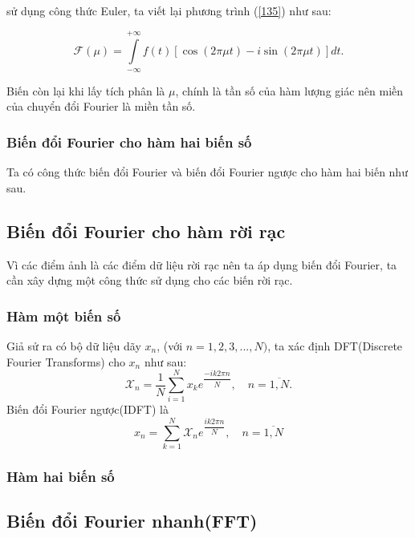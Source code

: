 \documentclass[12pt,a4paper]{report}
\numberwithin{equation}{section}
\theoremstyle{definition} %
\begin{document}
sử dụng công thức Euler, ta viết lại phương trình (\ref{135}) như sau:

\begin{equation}
	\label{137}
     \mathcal{F}(\mu)=\int\limits_{-\infty}^{+\infty}f(t)[\cos(2\pi\mu t)-i\sin(2\pi\mu t)]dt.
\end{equation}

Biến còn lại khi lấy tích phân là $\mu$, chính là tần số của hàm lượng giác nên miền của chuyển đổi Fourier là miền tần số.

\subsubsection{Biến đổi Fourier cho hàm hai biến số}

Ta có công thức biến đổi Fourier và biến đổi Fourier ngược cho hàm hai biến như sau.





\subsection{Biến đổi Fourier cho hàm rời rạc}

Vì các điểm ảnh là các điểm dữ liệu rời rạc nên ta áp dụng biến đổi Fourier, ta cần xây dựng một công thức sử dụng cho các biến rời rạc.

\subsubsection{Hàm một biến số}

Giả sử ra có bộ dữ liệu dãy $x_n$, (với $n= 1,2,3,...,N)$, ta xác định DFT(Discrete Fourier Transforms) cho $x_n$ như sau: 
\begin{equation}
	\label{144}
    \mathcal{X}_n= \dfrac{1}{N}\sum_{i=1}^Nx_ke^{\dfrac{-ik2\pi n}{N}},\quad n=\overline{1,N}.
\end{equation}
Biến đổi Fourier ngược(IDFT) là
\begin{equation}
	\label{145}
    x_n =\sum_{k=1}^N\mathcal{X}_ne^{\dfrac{ik2\pi n}{N}},\quad n=\overline{1,N}
\end{equation}
\subsubsection{Hàm hai biến số}
\subsection{Biến đổi Fourier nhanh(FFT)}
\end{document}
